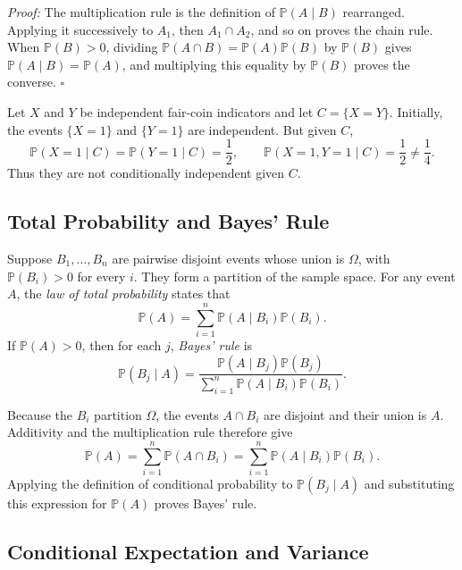 \documentclass[a4paper,11pt,abstracton]{scrartcl}
\theoremstyle{dotlessP}
\theoremstyle{dotlessS}
\theoremstyle{remark}
\theoremstyle{definition}
\begin{document}
\begin{claim_box}
\textit{Proof:} The multiplication rule is the definition of $\mathbb{P}(A\mid B)$ rearranged. Applying it successively to $A_1$, then $A_1\cap A_2$, and so on proves the chain rule. When $\mathbb{P}(B)>0$, dividing $\mathbb{P}(A\cap B)=\mathbb{P}(A)\mathbb{P}(B)$ by $\mathbb{P}(B)$ gives $\mathbb{P}(A\mid B)=\mathbb{P}(A)$, and multiplying this equality by $\mathbb{P}(B)$ proves the converse.
\hfill$\square$
\end{claim_box}
\begin{example_box}
Let $X$ and $Y$ be independent fair-coin indicators and let $C=\{X=Y\}$. Initially, the events $\{X=1\}$ and $\{Y=1\}$ are independent. But given $C$,
\[
  \mathbb{P}(X=1\mid C)=\mathbb{P}(Y=1\mid C)=\frac12,
  \qquad \mathbb{P}(X=1,Y=1\mid C)=\frac12\ne\frac14.
\]
Thus they are not conditionally independent given $C$.
\end{example_box}

\subsection{Total Probability and Bayes' Rule}


Suppose $B_1,\ldots,B_n$ are pairwise disjoint events whose union is $\Omega$, with $\mathbb{P}(B_i)>0$ for every $i$. They form a partition of the sample space. For any event $A$, the \emph{law of total probability} states that
\[
  \mathbb{P}(A)=\sum_{i=1}^{n}\mathbb{P}(A\mid B_i)\mathbb{P}(B_i).
\]
If $\mathbb{P}(A)>0$, then for each $j$, \emph{Bayes' rule} is
\[
  \mathbb{P}(B_j\mid A)
  =\frac{\mathbb{P}(A\mid B_j)\mathbb{P}(B_j)}
         {\displaystyle\sum_{i=1}^{n}\mathbb{P}(A\mid B_i)\mathbb{P}(B_i)}.
\]

\begin{claim_box}
Because the $B_i$ partition $\Omega$, the events $A\cap B_i$ are disjoint and their union is $A$. Additivity and the multiplication rule therefore give
\[
  \mathbb{P}(A)=\sum_{i=1}^{n}\mathbb{P}(A\cap B_i)
  =\sum_{i=1}^{n}\mathbb{P}(A\mid B_i)\mathbb{P}(B_i).
\]
Applying the definition of conditional probability to $\mathbb{P}(B_j\mid A)$ and substituting this expression for $\mathbb{P}(A)$ proves Bayes' rule.
\end{claim_box}

\subsection{Conditional Expectation and Variance}
\end{document}
